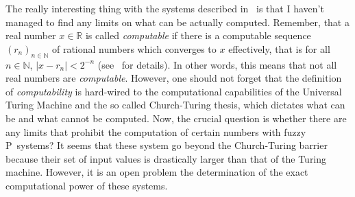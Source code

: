 \documentclass{amsart}
\theoremstyle{definition}
\begin{document}
The really interesting thing with the systems described in~\cite{syropoulos06} is that I 
haven't managed to find any limits on what can be actually computed. Remember, that
a real number $x\in\mathbb{R}$ is called {\em computable} if there is a computable
sequence $(r_{n})_{n\in\mathbb{N}}$ of rational numbers which converges to $x$ effectively,
that is for all $n\in\mathbb{N}$, $|x-r_{n}|<2^{-n}$ (see~\cite{weihrauch00,zheng01}
for details). In other words, this means that not all real numbers are {\em computable}.
However, one should not forget that the definition of {\em computability} is hard-wired to
the computational capabilities of the Universal Turing Machine and the so called
Church-Turing thesis, which dictates what can be and what cannot be computed. 
Now, the crucial question is whether there are any limits that prohibit the 
computation of certain numbers with fuzzy P~systems? It seems that these system
go beyond the Church-Turing barrier because their set of input values is drastically
larger than that of the Turing machine. However, it is an open problem the determination
of the exact computational power of these systems.
\end{document}
